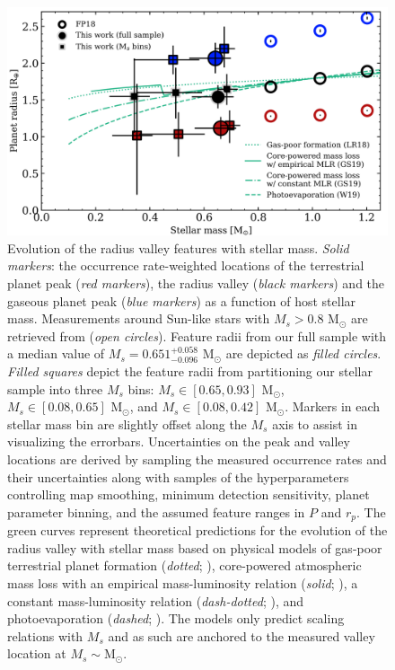 \documentclass[twocolumn]{emulateapj}
\begin{document}


\begin{figure}
  \centering
  \includegraphics[width=0.9\hsize]{figures/rpvMsFULL_KepK2.png}
  \caption{Evolution of the radius valley features with stellar mass. \emph{Solid markers}:
    the occurrence rate-weighted locations of the terrestrial planet peak (\emph{red markers}), the
    radius valley (\emph{black markers}) and the gaseous planet peak (\emph{blue markers})
    as a function of host stellar mass. Measurements around Sun-like stars with $M_s>0.8$ M$_{\odot}$ are
    retrieved from \cite{fulton18} (\emph{open circles}). Feature radii from our full sample with a median value of
    $M_s = 0.651^{+0.058}_{-0.096}$ M$_{\odot}$ are depicted as \emph{filled circles}. \emph{Filled squares}
    depict the feature radii from partitioning our stellar sample into three $M_s$ bins: $M_s \in [0.65,0.93]$ M$_{\odot}$,
    $M_s \in [0.08,0.65]$ M$_{\odot}$, and $M_s \in [0.08,0.42]$ M$_{\odot}$. Markers in each stellar mass bin are slightly
    offset along the $M_s$ axis to assist in visualizing the errorbars. Uncertainties on the
    peak and valley locations are derived by sampling the measured occurrence rates and their uncertainties along
    with samples of the hyperparameters controlling map smoothing, minimum detection sensitivity, planet parameter
    binning, and the assumed feature ranges in $P$ and $r_p$. The green
    curves represent theoretical predictions for the evolution of the radius valley with stellar mass based on
    physical models of gas-poor terrestrial planet formation (\emph{dotted}; \citealt{lopez18}),
    core-powered atmospheric mass loss
    with an empirical mass-luminosity relation (\emph{solid}; \citealt{gupta19b}), a constant mass-luminosity
    relation (\emph{dash-dotted}; \citealt{gupta19b}), and photoevaporation (\emph{dashed}; \citealt{wu19}).
    The models only predict scaling relations with $M_s$ and as such are anchored to the measured valley location
    at $M_s \sim \text{M}_{\odot}$.}
  \label{fig:rpvMs}
\end{figure}
\end{document}
